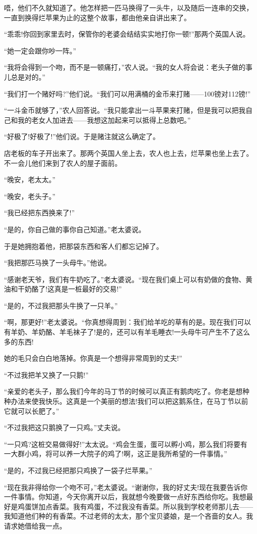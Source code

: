 \documentclass[10pt, a4paper]{ctexart} %
\begin{document}
唔，他们不久就知道了。他怎样把一匹马换得了一头牛，以及随后一连串的交换，一直到换得烂苹果为止的这整个故事，都由他亲自讲出来了。

“乖乖!你回到家里去时，保管你的老婆会结结实实地打你一顿!”那两个英国人说。

“她一定会跟你吵一阵。”

“我将会得到一个吻，而不是一顿痛打，”农人说。“我的女人将会说：老头子做的事儿总是对的。”

“我们打一个赌好吗?”他们说。“我们可以用满桶的金币来打赌——100镑对112镑!”

“一斗金币就够了，”农人回答说。“我只能拿出一斗苹果来打赌，但是我可以把我自己和我的老女人加进去——我想这加起来可以抵得上总数吧。”

“好极了!好极了!”他们说。于是赌注就这么确定了。

店老板的车子开出来了。那两个英国人坐上去，农人也上去，烂苹果也坐上去了。不一会儿他们来到了农人的屋子面前。

“晚安，老太太。”

“晚安，老头子。”

“我已经把东西换来了!”

“是的，你自己做的事你自己知道。”老太婆说。

于是她拥抱着他，把那袋东西和客人们都忘记掉了。

“我把那匹马换了一头母牛。”他说。

“感谢老天爷，我们有牛奶吃了。”老太婆说。“现在我们桌上可以有奶做的食物、黄油和干奶酪了!这真是一桩最好的交易!”

“是的，不过我把那头牛换了一只羊。”

“啊，那更好!”老太婆说。“你真想得周到：我们给羊吃的草有的是。现在我们可以有羊奶、羊奶酪、羊毛袜子了!是的，还可以有羊毛睡衣!一头母牛可产生不了这么多的东西!

她的毛只会白白地落掉。你真是一个想得非常周到的丈夫!”

“不过我把羊又换了一只鹅!”

“亲爱的老头子，那么我们今年的马丁节的时候可以真正有鹅肉吃了。你老是想种种办法来使我快乐。这真是一个美丽的想法!我们可以把这鹅系住，在马丁节以前它就可以长肥了。”

“不过我把这只鹅换了一只鸡。”丈夫说。

“一只鸡?这桩交易做得好!”太太说。“鸡会生蛋，蛋可以孵小鸡，那么我们将要有一大群小鸡，将可以养一大院子的鸡了!啊，这正是我所希望的一件事情。”

“是的，不过我已经把那只鸡换了一袋子烂苹果。”

“现在我非得给你一个吻不可，”老太婆说。“谢谢你，我的好丈夫!现在我要告诉你一件事情。你知道，今天你离开以后，我就想今晚要做一点好东西给你吃。我想最好是鸡蛋饼加点香菜。我有鸡蛋，不过我没有香菜。所以我到学校老师那儿去——我知道他们种的有香菜。不过老师的太太，那个宝贝婆娘，是一个吝啬的女人。我请求她借给我一点。
\end{document}
